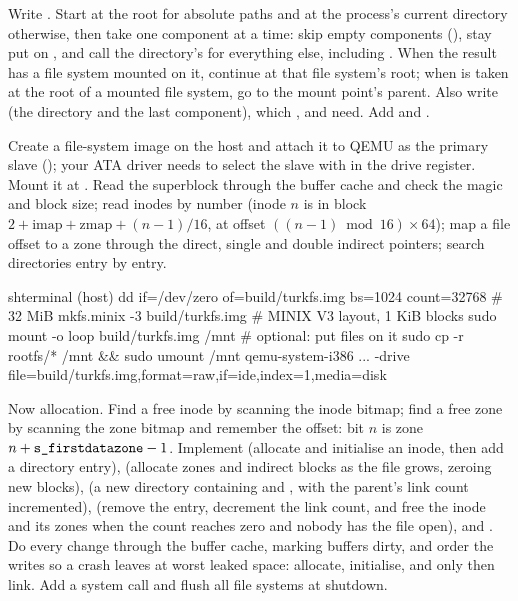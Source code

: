 \documentclass[11pt,a4paper]{article}
\begin{document}
Write . Start at the root for absolute paths and at the process's current directory
otherwise, then take one component at a time: skip empty components (\code{//}), stay put on , and call the
directory's  for everything else, including . When the result has a file system mounted on it,
continue at that file system's root; when  is taken at the root of a mounted file system, go to the mount
point's parent. Also write  (the directory and the last component), which , 
and  need. Add  and .

Create a file-system image on the host and attach it to QEMU as the primary slave (); your ATA driver needs
to select the slave with  in the drive register. Mount it at . Read the superblock through the
buffer cache and check the magic and block size; read inodes by number (inode $n$ is in block
$2 + \text{imap} + \text{zmap} + (n-1)/16$, at offset $((n-1) \bmod 16) \times 64$); map a file offset to a zone through the direct,
single and double indirect pointers; search directories entry by entry.

\begin{lst}{sh}{terminal (host)}
dd if=/dev/zero of=build/turkfs.img bs=1024 count=32768     # 32 MiB
mkfs.minix -3 build/turkfs.img                               # MINIX V3 layout, 1 KiB blocks
sudo mount -o loop build/turkfs.img /mnt                     # optional: put files on it
sudo cp -r rootfs/* /mnt && sudo umount /mnt
qemu-system-i386 ... -drive file=build/turkfs.img,format=raw,if=ide,index=1,media=disk
\end{lst}

Now allocation. Find a free inode by scanning the inode bitmap; find a free zone by scanning the zone bitmap and
remember the offset: bit $n$ is zone $n + \code{s_firstdatazone} - 1$. Implement  (allocate and
initialise an inode, then add a directory entry),  (allocate zones and indirect blocks as the file grows,
zeroing new blocks),  (a new directory containing  and , with the parent's link count
incremented),  (remove the entry, decrement the link count, and free the inode and its zones when the
count reaches zero and nobody has the file open), and . Do every change through the buffer cache,
marking buffers dirty, and order the writes so a crash leaves at worst leaked space: allocate, initialise, and only then
link. Add a  system call and flush all file systems at shutdown.
\end{document}
